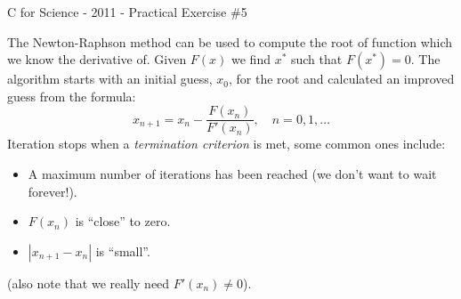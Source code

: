 \documentclass[a4paper,12pt]{article}
\begin{document}
\begin{center}
\large C for Science - 2011 - Practical Exercise \#5
\end{center}
The Newton-Raphson method can be used to compute the root of function which we know the derivative of. Given $F(x)$ we find $x^*$ such that $F(x^*) = 0$. The algorithm starts with an initial guess, $x_0$, for the root and calculated an improved guess from the formula:
\begin{equation}
x_{n+1} = x_n - \frac{F(x_n)}{F'(x_n)}, \quad n = 0,1,\ldots
\end{equation}
Iteration stops when a \emph{termination criterion} is met, some common ones include:
\begin{itemize}
\item A maximum number of iterations has been reached (we don't want to wait forever!).
\item $F(x_n)$ is ``close'' to zero.
\item $|x_{n+1}-x_n|$ is ``small''.
\end{itemize}
(also note that we really need $F'(x_n) \neq 0$).
\end{document}
